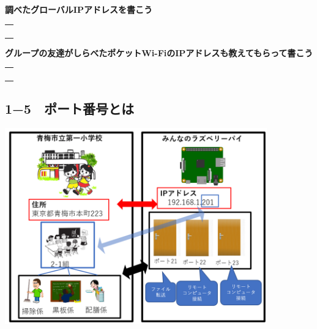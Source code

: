 \documentclass[a4paper,12pt,dvipdfmx]{jarticle}
\begin{document}
\bigskip


\bigskip

{\bfseries
	調べたグローバルIPアドレスを書こう}


\bigskip


\centering
\begin{tabular}{|p{}|} \hline
	\\
	\\
	\\
	\\ \hline
\end{tabular}


\flushleft




\bigskip


\bigskip

{\bfseries
	グループの友達がしらべたポケットWi-FiのIPアドレスも教えてもらって書こう}



\bigskip


\centering
\begin{tabular}{|p{}|} \hline
	\\
	\\
	\\
	\\ \hline
\end{tabular}


\flushleft



\bigskip


\bigskip

\clearpage\subsection*{1−5　ポート番号とは}


\centering
\includegraphics[width=0.85\textwidth]{ome7-img020.png}
\flushleft
\end{document}
